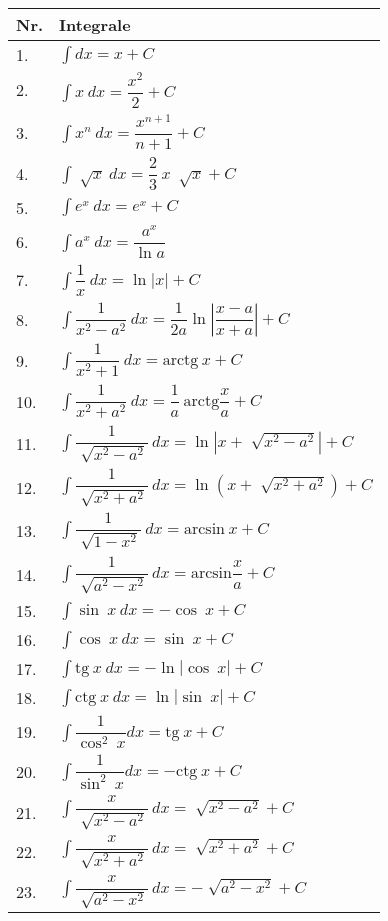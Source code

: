\documentclass{article}
\begin{document}
\begin{table}[!ht]
\begin{minipage}{0.5\linewidth}
\begin{tabular}{|m{1cm}|m{6.5cm}|}
\hline
\textbf{Nr.} & \textbf{Integrale} \\
\hline
1. & $\displaystyle\int dx = x + C $ \\
\hline
2. & $\displaystyle\int x\ dx = \dfrac{x^2}{2} + C $ \\
\hline
3. & $\displaystyle\int x^n\ dx = \dfrac{x^{n+1}}{n+1} + C $ \\
\hline
4. & $\displaystyle\int \sqrt[]{x}\ dx = \dfrac{2}{3}\ x\ \sqrt[]{x} + C $ \\
\hline
5. & $\displaystyle\int e^x\ dx = e^x + C $\\
\hline
6. & $\displaystyle\int a^x\ dx = \dfrac{a^x}{\ln a} $\\
\hline
7. & $\displaystyle\int \dfrac{1}{x}\ dx = \ln \left\lvert x \right\rvert + C $\\
\hline
8. & $\displaystyle\int \dfrac{1}{x^2-a^2}\ dx = \dfrac{1}{2a} \ln \left\lvert \dfrac{x-a}{x+a} \right\rvert + C $\\
\hline
9. & $\displaystyle\int \dfrac{1}{x^2+1}\ dx = \text{arctg}\ x + C $ \\
\hline
10. & $\displaystyle\int \dfrac{1}{x^2+a^2}\ dx = \dfrac{1}{a}\ \text{arctg} \dfrac{x}{a} + C $ \\
\hline
11. & $\displaystyle\int \dfrac{1}{\sqrt[]{x^2-a^2}}\ dx = \ln \left\lvert x + \sqrt[]{x^2-a^2} \right\rvert + C $ \\
\hline
12. & $\displaystyle\int \dfrac{1}{\sqrt[]{x^2+a^2}}\ dx = \ln \left( x+\sqrt[]{x^2+a^2} \right) + C $\\
\hline
13. & $\displaystyle\int \dfrac{1}{\sqrt[]{1-x^2}}\ dx = \text{arcsin}\ x + C $\\
\hline
14. & $\displaystyle\int \dfrac{1}{\sqrt[]{a^2-x^2}}\ dx = \text{arcsin} \dfrac{x}{a} + C $\\
\hline
15. & $\displaystyle\int \sin\ x\ dx = -\cos\ x + C $\\
\hline
16. & $\displaystyle\int \cos\ x\ dx = \sin\ x + C $\\
\hline
17. & $\displaystyle\int \text{tg}\ x\ dx = -\ln\left\lvert \cos\ x \right\rvert + C $\\
\hline
18. & $\displaystyle\int \text{ctg}\ x\ dx = \ln \left\lvert \sin\ x\right\rvert + C $\\
\hline
19. & $\displaystyle\int \dfrac{1}{\cos ^2\ x} dx = \text{tg}\ x + C $\\
\hline
20. & $\displaystyle\int \dfrac{1}{\sin ^2\ x} dx = -\text{ctg}\ x + C $\\
\hline
21. & $\displaystyle\int \dfrac{x}{\sqrt[]{x^2-a^2}}\ dx = \sqrt[]{x^2 - a^2} + C $\\
\hline
22. & $\displaystyle\int \dfrac{x}{\sqrt[]{x^2+a^2}}\ dx = \sqrt[]{x^2 + a^2} + C $\\
\hline
23. & $\displaystyle\int \dfrac{x}{\sqrt[]{a^2-x^2}}\ dx = -\sqrt[]{a^2 - x^2} + C $\\
\hline
\end{tabular}
\end{minipage}
\end{table}
\end{document}
